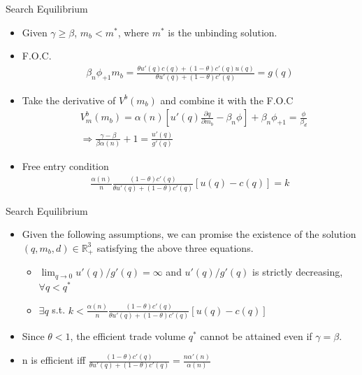 \documentclass{beamer}
\begin{document}
\begin{frame}{Search Equilibrium}
    \begin{itemize}
        \item Given $\gamma \geq \beta$, $m_{b} < m^{*}$, where $m^{*}$ is the unbinding solution.
        \item F.O.C.
        \begin{align*}
            \beta_{n}\phi_{+1}m_{b} = \frac{\theta u'(q)c(q)+(1-\theta)c'(q)u(q)}{\theta u'(q)+(1-\theta)c'(q)} = g(q)
         \end{align*}
         \item Take the derivative of $V^{b}(m_{b})$ and combine it with the F.O.C
        \begin{align*}
            &V_{m}^{b}(m_{b})=\alpha(n)\left[u'(q)\frac{\partial q}{\partial m_{b}}-\beta_{n}\phi_{}\right]+\beta_{n}\phi_{+1} = \frac{\phi}{\beta_{d}}\\
            &\Rightarrow \frac{\gamma-\beta}{\beta\alpha(n)}+1 = \frac{u'(q)}{g'(q)}
        \end{align*}
        \item Free entry condition
        \begin{align*}
            \frac{\alpha(n)}{n}\frac{(1-\theta)c'(q)}{\theta u'(q)+(1-\theta)c'(q)}\left[u(q)-c(q)\right] = k
        \end{align*}

        
    \end{itemize}
\end{frame}

\begin{frame}{Search Equilibrium}
    \begin{itemize}
    \item Given the following assumptions, we can promise the existence of the solution  $(q,m_{b},d)\in \mathbb{R}^{3}_{+}$ satisfying the above three equations.
    \begin{itemize}
        \item $\lim_{q\rightarrow0}u'(q)/g'(q) =\infty$ and $u'(q)/g'(q)$ is strictly decreasing, $ \forall q<q^{*}$
        \item $\exists q $ s.t. $k<            \frac{\alpha(n)}{n}\frac{(1-\theta)c'(q)}{\theta u'(q)+(1-\theta)c'(q)}\left[u(q)-c(q)\right]$
    \end{itemize}
        \item Since $\theta<1$, the efficient trade volume $q^{*}$ cannot be attained even if $\gamma = \beta$.
        \item n is efficient iff $\frac{(1-\theta)c'(q)}{\theta u'(q)+(1-\theta)c'(q)} = \frac{n \alpha'(n)}{\alpha(n)} $
    \end{itemize}

\end{frame}
\end{document}

